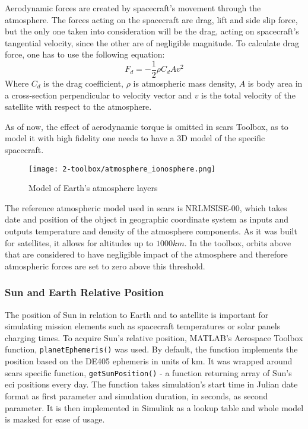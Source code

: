        Aerodynamic forces are created by spacecraft's movement through the atmosphere. The forces acting on the spacecraft are drag, lift and side slip force, but the only one taken into consideration will be the drag, acting on spacecraft's tangential velocity, since the other are of negligible magnitude. To calculate drag force, one has to use the following equation:
        \begin{equation}
            F_d = -\frac{1}{2}\rho C_d A v^2
        \end{equation}
        Where $C_d$ is the drag coefficient, $\rho$ is atmospheric mass density, $A$ is body area in a cross-section perpendicular to velocity vector and $v$ is the total velocity of the satellite with respect to the atmosphere.

        As of now, the effect of aerodynamic torque is omitted in \ac{scars} Toolbox, as to model it with high fidelity one needs to have a 3D model of the specific spacecraft.


        \begin{figure}[H]
            \centering
            \texttt{[image: 2-toolbox/atmosphere\_ionosphere.png]}
            \caption{Model of Earth's atmosphere layers}
            \label{fig:atmosphere}
        \end{figure}

        The reference atmospheric model used in \ac{scars} is NRLMSISE-00, which takes date and position of the object in geographic coordinate system as inputs and outputs temperature and density of the atmosphere components. As it was built for satellites, it allows for altitudes up to $1000km$. In the toolbox, orbits above that are considered to have negligible impact of the atmosphere and therefore atmospheric forces are set to zero above this threshold.

    \subsubsection{Sun and Earth Relative Position}
        The position of Sun in relation to Earth and to satellite is important for simulating mission elements such as spacecraft temperatures or solar panels charging times. To acquire Sun's relative position, MATLAB's Aerospace Toolbox function, \verb|planetEphemeris()| was used. By default, the function implements the position based on the DE405 ephemeris in units of km. It was wrapped around \ac{scars} specific function, \verb|getSunPosition()| - a function returning array of Sun's \ac{eci} positions every day. The function takes simulation's start time in Julian date format as first parameter and simulation duration, in seconds, as second parameter. It is then implemented in Simulink as a lookup table and whole model is masked for ease of usage.

